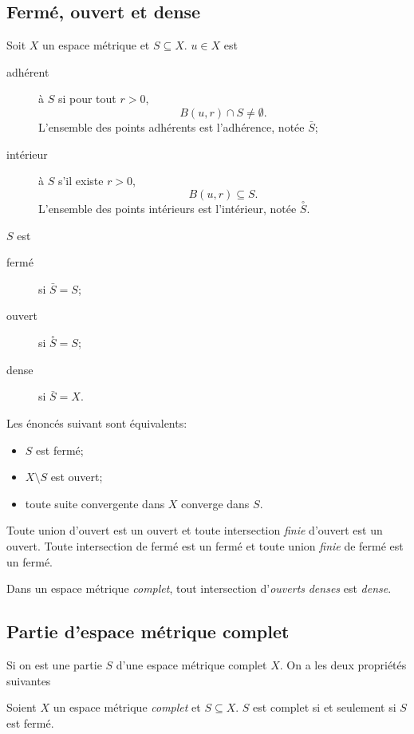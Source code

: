 \subsection{Fermé, ouvert et dense}
\begin{mydef}[2.10]
  Soit $X$ un espace métrique et $S \subseteq X$.
  $u \in X$ est
  \begin{description}
    \item[adhérent] à $S$ si pour tout $r > 0$,
      \[ B(u,r) \cap S \neq \emptyset. \]
      L'ensemble des points adhérents est l'adhérence, notée
      $\bar{S}$;
    \item[intérieur] à $S$ s'il existe $r > 0$,
      \[ B(u,r) \subseteq S. \]
      L'ensemble des points intérieurs est l'intérieur, notée
      $\overset{\circ}{S}$.
  \end{description}
  $S$ est
  \begin{description}
    \item[fermé] si $\bar{S} = S$;
    \item[ouvert] si $\overset{\circ}{S} = S$;
    \item[dense] si $\bar{S} = X$.
  \end{description}
\end{mydef}

\begin{myprop}[2.11]
  Les énoncés suivant sont équivalents:
  \begin{itemize}
    \item $S$ est fermé;
    \item $X \setminus S$ est ouvert;
    \item toute suite convergente dans $X$ converge dans $S$.
  \end{itemize}
\end{myprop}

\begin{myprop}[2.12]
  Toute union d'ouvert est un ouvert et toute intersection
  \emph{finie} d'ouvert est un ouvert.
  Toute intersection de fermé est un fermé et toute union
  \emph{finie} de fermé est un fermé.
\end{myprop}

\begin{mytheo}[Baire 2.13]
  Dans un espace métrique \emph{complet},
  tout intersection d'\emph{ouverts} \emph{denses} est
  \emph{dense}.
\end{mytheo}

\subsection{Partie d'espace métrique complet}
Si on est une partie $S$ d'une espace métrique complet $X$.
On a les deux propriétés suivantes
\begin{myprop}[2.15]
  Soient $X$ un espace métrique \emph{complet} et $S \subseteq X$.
  $S$ est complet si et seulement si $S$ est fermé.
\end{myprop}

